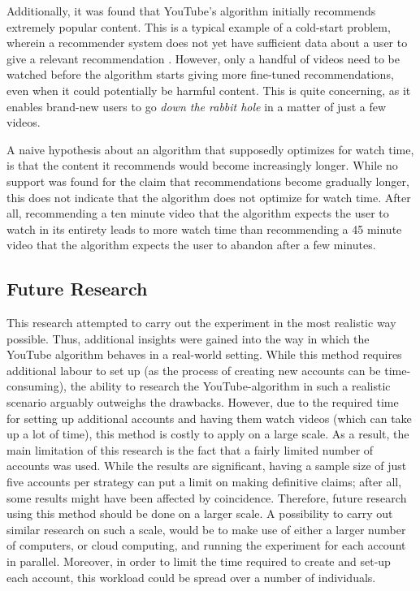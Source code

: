 \documentclass[../main.tex]{subfiles}
\begin{document}
Additionally, it was found that YouTube's algorithm initially recommends extremely popular content. This is a typical
example of a cold-start problem, wherein a recommender system does not yet have sufficient data about a user to give a
relevant recommendation \citep{lam2008addressing}. However, only a handful of videos need to be watched before the
algorithm starts giving more fine-tuned recommendations, even when it could potentially be harmful content. This
is quite concerning, as it enables brand-new users to go \textit{down the rabbit hole} in a matter of just a few videos.

A naive hypothesis about an algorithm that supposedly optimizes for watch time, is that the content it recommends would
become increasingly longer. While no support was found for the claim that recommendations become gradually longer, this
does not indicate that the algorithm does not optimize for watch time. After all, recommending a ten minute video that
the algorithm expects the user to watch in its entirety leads to more watch time than recommending a 45 minute video
that the algorithm expects the user to abandon after a few minutes. 

\subsection{Future Research}
This research attempted to carry out the experiment in the most realistic way possible. Thus, additional insights were 
gained into the way in which the YouTube algorithm behaves in a real-world setting. While this method requires 
additional labour to set up (as the process of creating new accounts can be time-consuming), the ability to research the
YouTube-algorithm in such a realistic scenario arguably outweighs the drawbacks. However, due to the required time for
setting up additional accounts and having them watch videos (which can take up a lot of time), this method is costly to
apply on a large scale. As a result, the main limitation of this research is the fact that a fairly limited number of
accounts was used. While the results are significant, having a sample size of just five accounts per strategy can put
a limit on making definitive claims; after all, some results might have been affected by coincidence. Therefore, future
research using this method should be done on a larger scale. A possibility to carry out similar research on such a
scale, would be to make use of either a larger number of computers, or cloud computing, and running the experiment for
each account in parallel. Moreover, in order to limit the time required to create and set-up each account, this workload
could be spread over a number of individuals. 
\end{document}

